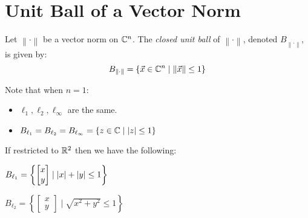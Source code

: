 \documentclass[letterpaper,12pt,fleqn]{article}
\newcommand{\norm}[1]{\left\lVert#1\right\rVert}
\newcommand{\nc}{\norm{\cdot}}
\newcommand{\bn}{B_{\nc}}
\newcommand{\vx}{\vec{x}}
\begin{document}
\section*{Unit Ball of a Vector Norm}

\begin{definition}
  Let $\nc$ be a vector norm on $\mathbb{C}^n$. The \emph{closed unit ball} of $\nc$,
  denoted $\bn$, is given by:
  \[\bn=\{\vx\in\C^n\mid\norm{\vx}\le1\}\]
\end{definition}

Note that when $n=1$:

\begin{minipage}{3.5in}
\begin{itemize}
\item $\ell_1,\ell_2,\ell_{\infty}$ are the same.
\item $B_{\ell_1}=B_{\ell_2}=B_{\ell_{\infty}}=\{z\in\mathbb{C}\mid\lvert z\rvert\le1\}$
\end{itemize}
\end{minipage}
\begin{minipage}{3in}
\end{minipage}

If restricted to $\mathbb{R}^2$ then we have the following:

\newcommand{\xy}{\begin{bmatrix} x \\ y \end{bmatrix}}

\begin{minipage}{3in}
  $B_{\ell_1}=\left\{\xy\mid\abs{x}+\abs{y}\le1\right\}$
\end{minipage}
\begin{minipage}{3in}
\end{minipage}

\begin{minipage}{3in}
  $B_{\ell_2}=\left\{\xy\mid\sqrt{x^2+y^2}\le1\right\}$
\end{minipage}
\begin{minipage}{3in}
\end{minipage}
\end{document}
